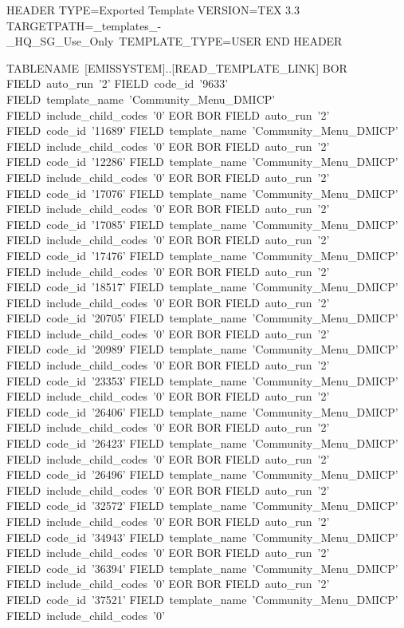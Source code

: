 HEADER
TYPE=Exported Template
VERSION=TEX 3.3
TARGETPATH=\Live_templates_-_HQ_SG_Use_Only\Community\
TEMPLATE_TYPE=USER
END HEADER

TABLENAME~[EMISSYSTEM]..[READ_TEMPLATE_LINK]
  BOR
    FIELD~auto_run~'2'
    FIELD~code_id~'9633'
    FIELD~template_name~'Community_Menu_DMICP'
    FIELD~include_child_codes~'0'
  EOR
  BOR
    FIELD~auto_run~'2'
    FIELD~code_id~'11689'
    FIELD~template_name~'Community_Menu_DMICP'
    FIELD~include_child_codes~'0'
  EOR
  BOR
    FIELD~auto_run~'2'
    FIELD~code_id~'12286'
    FIELD~template_name~'Community_Menu_DMICP'
    FIELD~include_child_codes~'0'
  EOR
  BOR
    FIELD~auto_run~'2'
    FIELD~code_id~'17076'
    FIELD~template_name~'Community_Menu_DMICP'
    FIELD~include_child_codes~'0'
  EOR
  BOR
    FIELD~auto_run~'2'
    FIELD~code_id~'17085'
    FIELD~template_name~'Community_Menu_DMICP'
    FIELD~include_child_codes~'0'
  EOR
  BOR
    FIELD~auto_run~'2'
    FIELD~code_id~'17476'
    FIELD~template_name~'Community_Menu_DMICP'
    FIELD~include_child_codes~'0'
  EOR
  BOR
    FIELD~auto_run~'2'
    FIELD~code_id~'18517'
    FIELD~template_name~'Community_Menu_DMICP'
    FIELD~include_child_codes~'0'
  EOR
  BOR
    FIELD~auto_run~'2'
    FIELD~code_id~'20705'
    FIELD~template_name~'Community_Menu_DMICP'
    FIELD~include_child_codes~'0'
  EOR
  BOR
    FIELD~auto_run~'2'
    FIELD~code_id~'20989'
    FIELD~template_name~'Community_Menu_DMICP'
    FIELD~include_child_codes~'0'
  EOR
  BOR
    FIELD~auto_run~'2'
    FIELD~code_id~'23353'
    FIELD~template_name~'Community_Menu_DMICP'
    FIELD~include_child_codes~'0'
  EOR
  BOR
    FIELD~auto_run~'2'
    FIELD~code_id~'26406'
    FIELD~template_name~'Community_Menu_DMICP'
    FIELD~include_child_codes~'0'
  EOR
  BOR
    FIELD~auto_run~'2'
    FIELD~code_id~'26423'
    FIELD~template_name~'Community_Menu_DMICP'
    FIELD~include_child_codes~'0'
  EOR
  BOR
    FIELD~auto_run~'2'
    FIELD~code_id~'26496'
    FIELD~template_name~'Community_Menu_DMICP'
    FIELD~include_child_codes~'0'
  EOR
  BOR
    FIELD~auto_run~'2'
    FIELD~code_id~'32572'
    FIELD~template_name~'Community_Menu_DMICP'
    FIELD~include_child_codes~'0'
  EOR
  BOR
    FIELD~auto_run~'2'
    FIELD~code_id~'34943'
    FIELD~template_name~'Community_Menu_DMICP'
    FIELD~include_child_codes~'0'
  EOR
  BOR
    FIELD~auto_run~'2'
    FIELD~code_id~'36394'
    FIELD~template_name~'Community_Menu_DMICP'
    FIELD~include_child_codes~'0'
  EOR
  BOR
    FIELD~auto_run~'2'
    FIELD~code_id~'37521'
    FIELD~template_name~'Community_Menu_DMICP'
    FIELD~include_child_codes~'0'
